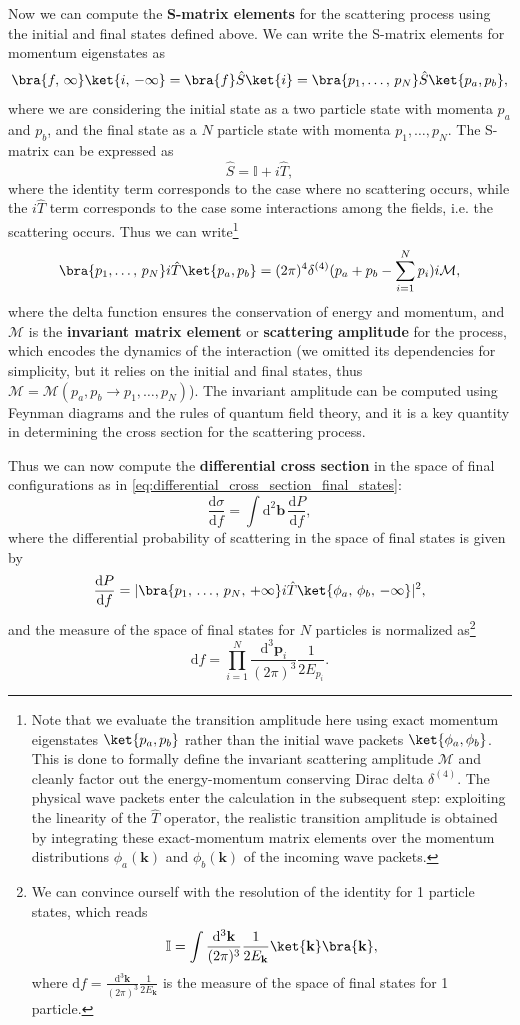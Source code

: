 Now we can compute the \textbf{S-matrix elements} for the scattering process using the initial and final states defined above. We can write the S-matrix elements for momentum eigenstates as
\[
    \bra{f,\,\infty} \ket{i,\,-\infty} = \bra{f} \hat{S} \ket{i} = \bra{p_1, \ldots,\,p_N} \hat{S} \ket{p_a, p_b},
\]
where we are considering the initial state as a two particle state with momenta \(p_a\) and \(p_b\), and the final state as a \(N\) particle state with momenta \(p_1, \ldots, p_N\). The S-matrix can be expressed as
\[
    \hat{S} = \mathbb{I} + i \hat{T},
\]
where the identity term corresponds to the case where no scattering occurs, while the \(i \hat{T}\) term corresponds to the case some interactions among the fields, i.e. the scattering occurs. Thus we can write\footnote{Note that we evaluate the transition amplitude here using exact momentum eigenstates $\ket{p_a, p_b}$ rather than the initial wave packets $\ket{\phi_a, \phi_b}$. This is done to formally define the invariant scattering amplitude $\mathcal{M}$ and cleanly factor out the energy-momentum conserving Dirac delta $\delta^{(4)}$. The physical wave packets enter the calculation in the subsequent step: exploiting the linearity of the $\hat{T}$ operator, the realistic transition amplitude is obtained by integrating these exact-momentum matrix elements over the momentum distributions $\phi_a(\mathbf{k})$ and $\phi_b(\mathbf{k})$ of the incoming wave packets.}
\[
    \bra{p_1, \ldots,\,p_N} i \hat{T} \ket{p_a, p_b} = (2\pi)^4 \delta^{(4)}(p_a + p_b - \sum_{i=1}^N p_i) i \mathcal{M},
\]
where the delta function ensures the conservation of energy and momentum, and \(\mathcal{M}\) is the \textbf{invariant matrix element} or \textbf{scattering amplitude} for the process, which encodes the dynamics of the interaction (we omitted its dependencies for simplicity, but it relies on the initial and final states, thus \(\mathcal{M} = \mathcal{M}(p_a, p_b \to p_1, \ldots, p_N)\)). The invariant amplitude can be computed using Feynman diagrams and the rules of quantum field theory, and it is a key quantity in determining the cross section for the scattering process.

Thus we can now compute the \textbf{differential cross section} in the space of final configurations as in \eqref{eq:differential_cross_section_final_states}:
\[
    \frac{\mathrm{d} \sigma}{\mathrm{d} f} = \int \mathrm{d}^2 \mathbf{b} \, \frac{\mathrm{d} P}{\mathrm{d} f},
\]
where the differential probability of scattering in the space of final states is given by
\[
    \frac{\mathrm{d} P}{\mathrm{d} f} = \vert \bra{p_1,\,\ldots,\,p_N,\,+\infty} i \hat{T} \ket{\phi_a,\, \phi_b,\, -\infty} \vert^2,
\]
and the measure of the space of final states for \(N\) particles is normalized as\footnote{We can convince ourself with the resolution of the identity for 1 particle states, which reads
    \[
        \mathbb{I} = \int \frac{\mathrm{d}^3 \mathbf{k}}{(2\pi)^3} \frac{1}{2 E_{\mathbf{k}}} \ket{\mathbf{k}}\bra{\mathbf{k}},
    \]
    where \(\mathrm{d} f = \frac{\mathrm{d}^3 \mathbf{k}}{(2\pi)^3} \frac{1}{2 E_{\mathbf{k}}}\) is the measure of the space of final states for 1 particle.}
\[
    \mathrm{d} f = \prod_{i=1}^N \frac{\mathrm{d}^3 \mathbf{p}_i}{(2\pi)^3} \frac{1}{2 E_{p_i}}.
\]

